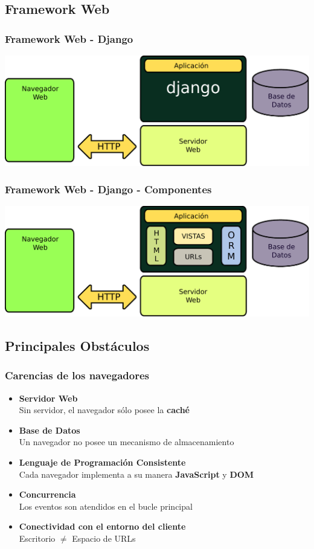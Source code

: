 \documentclass{beamer}
\begin{document}
\subsection{Framework Web}
\begin{frame}
\frametitle{Framework Web - Django}
\includegraphics[scale=0.5]{fw_django.pdf}
\end{frame}

\begin{frame}
\frametitle{Framework Web - Django - Componentes}
\includegraphics[scale=0.5]{fw_django_comp.pdf}
\end{frame}

\subsection{Principales Obstáculos}
\begin{frame}
    \frametitle{Carencias de los navegadores}
    \begin{itemize}
        \item{{\bf Servidor Web}\\
            Sin servidor, el navegador sólo posee la {\bf caché}}
        \item{{\bf Base de Datos} \\
            Un navegador no posee un mecanismo de almacenamiento}
        \item{{\bf Lenguaje de Programación Consistente}\\
            Cada navegador implementa a su manera {\bf JavaScript} y {\bf DOM}}
        \item{{\bf Concurrencia} \\
            Los eventos son atendidos en el bucle principal}
        \item{{\bf Conectividad con el entorno del cliente}\\
            Escritorio $\not=$ Espacio de URLs}
    \end{itemize}
\end{frame}
\end{document}
